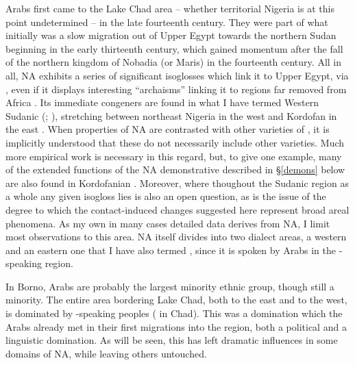 \documentclass[output=paper]{langsci/langscibook}
\begin{document}
Arabs first came to the {Lake Chad} area – whether territorial Nigeria is at this point undetermined – in the late fourteenth century. They were part of what initially was a slow migration out of Upper Egypt towards the northern Sudan beginning in the early thirteenth century, which gained momentum after the fall of the northern  kingdom of Nobadia (or Maris) in the fourteenth century. All in all, NA exhibits a series of significant isoglosses which link it to Upper Egypt, via  , even if it displays interesting “archaisms” linking it to regions far removed from Africa \citep{Owens2013}. Its immediate congeners are found in what I have termed {Western} Sudanic  (; \citealt{Owens1994editor,Owens1994author}), stretching between northeast Nigeria in the west and Kordofan in the east \citep{Manfredi2010}. When properties of NA are contrasted with other varieties of , it is implicitly understood that these do not necessarily include other  varieties. Much more empirical work is necessary in this regard, but, to give one example, many of the extended functions of the NA demonstrative described in §\ref{demons} below are also found in Kordofanian  \citep{Manfredi2014demonstratives}. Moreover, where thoughout the Sudanic region as a whole any given isogloss lies is also an open question, as is the issue of the degree to which the contact-induced changes suggested here represent broad areal phenomena. As my own in many cases detailed data derives from NA, I limit most observations to this area. NA itself divides into two dialect areas, a western and an eastern one that I have also termed  , since it is spoken by Arabs in the -speaking region.

In {Borno}, Arabs are probably the largest minority ethnic group, though still a minority. The entire area bordering {Lake Chad}, both to the east and to the west, is dominated by -speaking peoples ( in Chad). This was a domination which the Arabs already met in their first migrations into the region, both a political and a linguistic domination. As will be seen, this has left dramatic influences in some domains of NA, while leaving others untouched.
\end{document}

